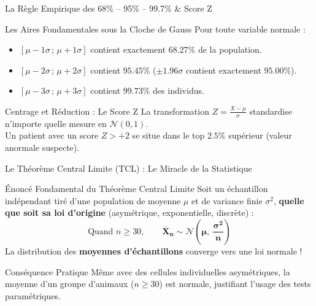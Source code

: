 \documentclass[aspectratio=169,10pt]{beamer}
\begin{document}
\begin{frame}{La Règle Empirique des 68\% -- 95\% -- 99.7\% \& Score Z}
  \begin{conceptbox}{Les Aires Fondamentales sous la Cloche de Gauss}
    Pour toute variable normale :
    \begin{itemize}\setlength{\itemsep}{1.5pt}
      \item $[\mu - 1\sigma \,;\, \mu + 1\sigma]$ contient exactement $\mathbf{68.27\%}$ de la population.
      \item $[\mu - 2\sigma \,;\, \mu + 2\sigma]$ contient $\mathbf{95.45\%}$ ($\pm 1.96\sigma$ contient exactement $\mathbf{95.00\%}$).
      \item $[\mu - 3\sigma \,;\, \mu + 3\sigma]$ contient $\mathbf{99.73\%}$ des individus.
    \end{itemize}
  \end{conceptbox}
  \vspace{1.5mm}
  \begin{biobox}{Centrage et Réduction : Le Score Z}
    La transformation $Z = \frac{X - \mu}{\sigma}$ standardise n'importe quelle mesure en $\mathcal{N}(0, 1)$.\\
    Un patient avec un score $Z > +2$ se situe dans le top $2.5\%$ supérieur (valeur anormale suspecte).
  \end{biobox}
\end{frame}

\begin{frame}{Le Théorème Central Limite (TCL) : Le Miracle de la Statistique}
  \begin{conceptbox}{Énoncé Fondamental du Théorème Central Limite}
    Soit un échantillon indépendant tiré d'une population de moyenne $\mu$ et de variance finie $\sigma^2$, \textbf{quelle que soit sa loi d'origine} (asymétrique, exponentielle, discrète) :
    \begin{equation*}
      \text{Quand } n \ge 30, \qquad \mathbf{\bar{X}_n \sim \mathcal{N}\left(\mu, \ \frac{\sigma^2}{n}\right)}
    \end{equation*}
    La distribution des \textbf{moyennes d'échantillons} converge vers une loi normale !
  \end{conceptbox}
  \vspace{1.5mm}
  \begin{takeawaybox}{Conséquence Pratique}
    Même avec des cellules individuelles asymétriques, la moyenne d'un groupe d'animaux ($n \ge 30$) est normale, justifiant l'usage des tests paramétriques.
  \end{takeawaybox}
\end{frame}
\end{document}
